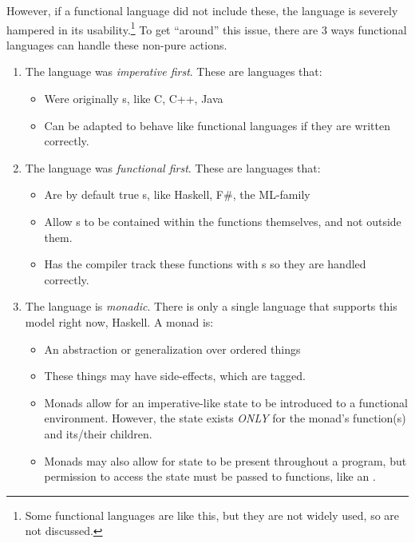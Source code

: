 However, if a functional language did not include these, the language is severely hampered in its usability.\footnote{Some functional languages are like this, but they are not widely used, so are not discussed.}
To get ``around'' this issue, there are 3 ways functional languages can handle these non-pure actions.
\begin{enumerate}[noitemsep]
\item The language was \emph{imperative first}.
  These are languages that:
  \begin{itemize}[noitemsep]
  \item Were originally s, like C, C++, Java
  \item Can be adapted to behave like functional languages if they are written correctly.
  \end{itemize}
\item The language was \emph{functional first}.
  These are languages that:
  \begin{itemize}[noitemsep]
  \item Are by default true s, like Haskell, F\#, the ML-family
  \item Allow s to be contained within the functions themselves, and not outside them.
  \item Has the compiler track these functions with s so they are handled correctly.
  \end{itemize}
\item The language is \emph{monadic}.
  There is only a single language that supports this model right now, Haskell.
  A monad is:
  \begin{itemize}[noitemsep]
  \item An abstraction or generalization over ordered things
  \item These things may have side-effects, which are tagged.
  \item Monads allow for an imperative-like state to be introduced to a functional environment. However, the state exists \emph{ONLY} for the monad's function(s) and its/their children.
  \item Monads may also allow for state to be present throughout a program, but permission to access the state must be passed to functions, like an .
  \end{itemize}
\end{enumerate}

